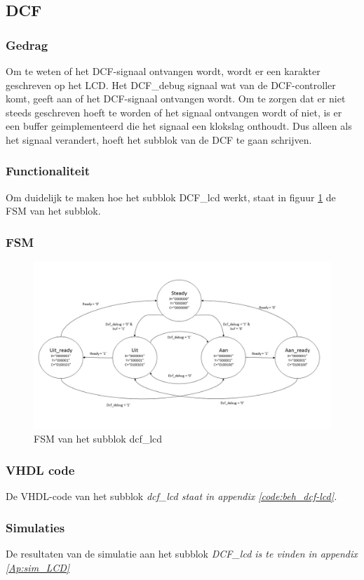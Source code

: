 \subsection{DCF}

\subsubsection{Gedrag}
Om te weten of het DCF-signaal ontvangen wordt, wordt er een karakter geschreven op het LCD. Het DCF\_debug signaal wat van de DCF-controller komt, geeft aan of het DCF-signaal ontvangen wordt. Om te zorgen dat er niet steeds geschreven hoeft te worden of het signaal ontvangen wordt of niet, is er een buffer geimplementeerd die het signaal een klokslag onthoudt. Dus alleen als het signaal verandert, hoeft het subblok van de DCF te gaan schrijven.

\subsubsection{Functionaliteit}
Om duidelijk te maken hoe het subblok DCF\_lcd werkt, staat in figuur \ref{fig:FSMdcf} de FSM van het subblok.

\subsubsection{FSM}

\begin{figure}[h!]
\includegraphics[width=15cm]{verslagschemas/FSMs/FSMdcf}
\caption{FSM van het subblok dcf\_lcd}
\label{fig:FSMdcf}
\end{figure}

\subsubsection{VHDL code}
De VHDL-code van het subblok \it{dcf\_lcd} staat in appendix \ref{code:beh_dcf-lcd}.

\subsubsection{Simulaties}
De resultaten van de simulatie aan het subblok \it{DCF\_lcd} is te vinden in appendix \ref{Ap:sim_LCD}
